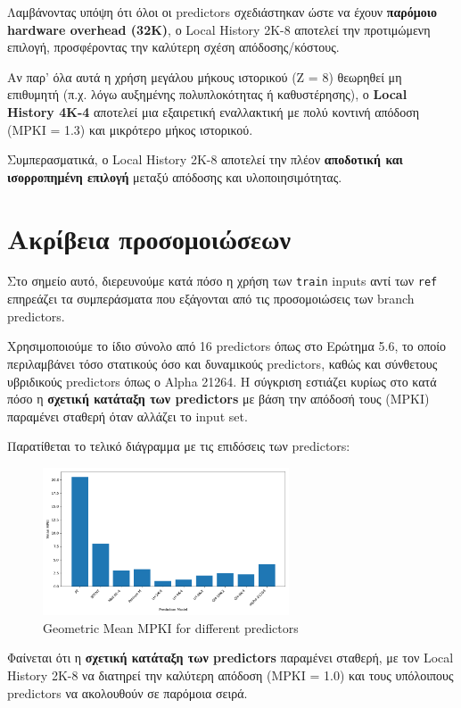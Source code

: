\documentclass{article}
\begin{document}
Λαμβάνοντας υπόψη ότι όλοι οι predictors σχεδιάστηκαν ώστε να έχουν \textbf{παρόμοιο hardware overhead (32Κ)}, ο Local History 2K-8 αποτελεί την προτιμώμενη επιλογή, προσφέροντας την καλύτερη σχέση απόδοσης/κόστους. 

Αν παρ' όλα αυτά η χρήση μεγάλου μήκους ιστορικού (Ζ = 8) θεωρηθεί μη επιθυμητή (π.χ. λόγω αυξημένης πολυπλοκότητας ή καθυστέρησης), ο \textbf{Local History 4K-4} αποτελεί μια εξαιρετική εναλλακτική με πολύ κοντινή απόδοση (MPKI = 1.3) και μικρότερο μήκος ιστορικού.

\bigskip
Συμπερασματικά, ο Local History 2K-8 αποτελεί την πλέον \textbf{αποδοτική και ισορροπημένη επιλογή} μεταξύ απόδοσης και υλοποιησιμότητας.

\section{Ακρίβεια προσομοιώσεων}

Στο σημείο αυτό, διερευνούμε κατά πόσο η χρήση των \texttt{train} inputs αντί των \texttt{ref} επηρεάζει τα συμπεράσματα που εξάγονται από τις προσομοιώσεις των branch predictors.

Χρησιμοποιούμε το ίδιο σύνολο από 16 predictors όπως στο Ερώτημα 5.6, το οποίο περιλαμβάνει τόσο στατικούς όσο και δυναμικούς predictors, καθώς και σύνθετους υβριδικούς predictors όπως ο Alpha 21264. Η σύγκριση εστιάζει κυρίως στο κατά πόσο η \textbf{σχετική κατάταξη των predictors} με βάση την απόδοσή τους (MPKI) παραμένει σταθερή όταν αλλάζει το input set.

Παρατίθεται το τελικό διάγραμμα με τις επιδόσεις των predictors:

\begin{figure}[H]
    \centering
    \includegraphics[width=0.65\textwidth]{figures/5_6/geom_mean.png}
    \caption{Geometric Mean MPKI for different predictors}
    \label{fig:train_dataset_predictors}
\end{figure}

Φαίνεται ότι η \textbf{σχετική κατάταξη των predictors} παραμένει σταθερή, με τον Local History 2K-8 να διατηρεί την καλύτερη απόδοση (MPKI = 1.0) και τους υπόλοιπους predictors να ακολουθούν σε παρόμοια σειρά.
\end{document}

